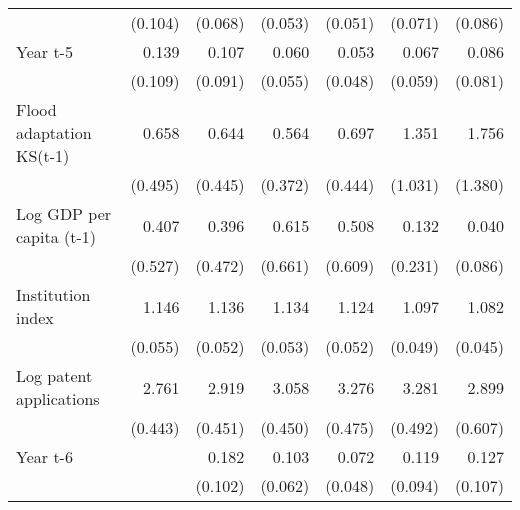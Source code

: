 \begin{table}[htbp]
\begin{tabular}{l*{6}{D{.}{.}{-1}}}
                    &     (0.104)         &     (0.068)         &     (0.053)         &     (0.051)         &     (0.071)         &     (0.086)         \\
\addlinespace
Year t-5            &       0.139\sym{**} &       0.107\sym{***}&       0.060\sym{***}&       0.053\sym{***}&       0.067\sym{***}&       0.086\sym{***}\\
                    &     (0.109)         &     (0.091)         &     (0.055)         &     (0.048)         &     (0.059)         &     (0.081)         \\
\addlinespace
Flood adaptation KS(t-1)&       0.658         &       0.644         &       0.564         &       0.697         &       1.351         &       1.756         \\
                    &     (0.495)         &     (0.445)         &     (0.372)         &     (0.444)         &     (1.031)         &     (1.380)         \\
\addlinespace
Log GDP per capita (t-1)&       0.407         &       0.396         &       0.615         &       0.508         &       0.132         &       0.040\sym{\%}  \\
                    &     (0.527)         &     (0.472)         &     (0.661)         &     (0.609)         &     (0.231)         &     (0.086)         \\
\addlinespace
Institution index   &       1.146\sym{***}&       1.136\sym{***}&       1.134\sym{***}&       1.124\sym{**} &       1.097\sym{**} &       1.082\sym{*}  \\
                    &     (0.055)         &     (0.052)         &     (0.053)         &     (0.052)         &     (0.049)         &     (0.045)         \\
\addlinespace
Log patent applications&       2.761\sym{***}&       2.919\sym{***}&       3.058\sym{***}&       3.276\sym{***}&       3.281\sym{***}&       2.899\sym{***}\\
                    &     (0.443)         &     (0.451)         &     (0.450)         &     (0.475)         &     (0.492)         &     (0.607)         \\
\addlinespace
Year t-6            &                     &       0.182\sym{***}&       0.103\sym{***}&       0.072\sym{***}&       0.119\sym{***}&       0.127\sym{**} \\
                    &                     &     (0.102)         &     (0.062)         &     (0.048)         &     (0.094)         &     (0.107)         \\

\end{tabular}
\end{table}
